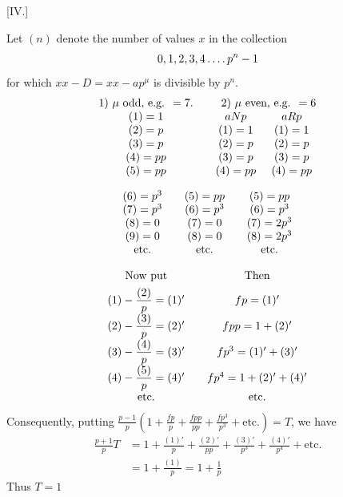 \par\bigskip{}\centerline{[IV.]}\medskip
Let $(n)$ denote the number of values $x$ in the collection
\[
0,1,2,3,4\mathinner{.\,.\,.\,.} p^n-1
\]
for which $xx-D=xx-ap^\mu$ is divisible by $p^n$.
\[
\begin{array}{c@{\qquad}cc}
1)\ \mu\text{ odd, e.g. }=7.&\multicolumn2c{2)\ \mu\text{ even, e.g. }=6}\\
(1)=1&aNp&aRp\\
(2)=p&(1)=1&(1)=1\\
(3)=p&(2)=p&(2)=p\\
(4)=pp&(3)=p&(3)=p\\
(5)=pp&(4)=pp&(4)=pp
\end{array}
\]

\[
\begin{array}{c@{\qquad}c@{\qquad}c}
(6)=p^3&(5)=pp&(5)=pp\\
(7)=p^3&(6)=p^3&(6)=p^3\\
(8)=0&(7)=0&(7)=2p^3\\
(9)=0&(8)=0&(8)=2p^3\\
\text{etc.}&\text{etc.}&\text{etc.}
\end{array}
\]

\[
\begin{array}{c@{\qquad}c}
\text{Now put}&\text{Then}\\[.4em]
(1)-\dfrac{(2)}p=(1)'&fp=(1)'\\[.4em]
(2)-\dfrac{(3)}p=(2)'&fpp=1+(2)'\\[.4em]
(3)-\dfrac{(4)}p=(3)'&fp^3=(1)'+(3)'\\[.4em]
(4)-\dfrac{(5)}p=(4)'&fp^4=1+(2)'+(4)'\\
\text{etc.}&\text{etc.}
\end{array}
\]
Consequently, putting $\frac{p-1}p(1+\frac{fp}p+\frac{fpp}{pp}+\frac{fp^3}{p^3}+\text{etc.})=T$, we have
\[
\begin{aligned}
\frac{p+1}p T&=1+\frac{(1)'}p+\frac{(2)'}{pp}+\frac{(3)'}{p^3}+\frac{(4)'}{p^4}+\text{etc.}\\
&=1+\frac{(1)}p=1+\frac1p
\end{aligned}
\]
Thus $T=1$
